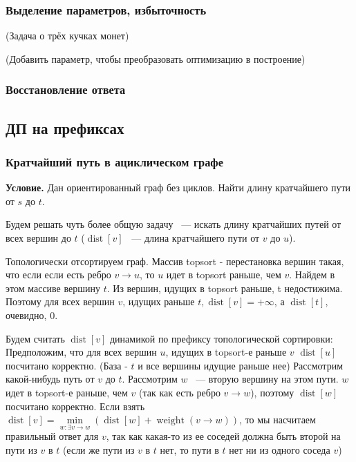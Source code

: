 \documentclass[a4paper,12pt]{article}
\begin{document}
      \subsubsection{Выделение параметров, избыточность}

      (Задача о трёх кучках монет)

      (Добавить параметр, чтобы преобразовать оптимизацию в построение)

      \subsubsection{Восстановление ответа}

    \subsection{ДП на префиксах}

      \subsubsection{Кратчайший путь в ациклическом графе}
      \textbf{Условие.} Дан ориентированный граф без циклов. Найти 
      длину кратчайшего пути от $s$ до $t$.
      
      Будем решать чуть более общую задачу ~--- искать длину кратчайших 
      путей от всех вершин до $t$ ($\operatorname{dist}[v]$ ~--- длина 
      кратчайшего пути от $v$ до $u$).
      
      Топологически отсортируем граф. Массив topsort - перестановка 
      вершин такая, что если если есть ребро $v\rightarrow u$, то $u$ 
      идет в topsort раньше, чем $v$. Найдем в этом массиве вершину $t$. 
      Из вершин, идущих в topsort раньше, t недостижима. Поэтому 
      для всех вершин $v$, идущих раньше $t, \operatorname{dist}[v] = +\infty$, а 
      $\operatorname{dist}[t]$, очевидно, $0$.
      
      Будем считать $\operatorname{dist}[v]$ динамикой по префиксу 
      топологической сортировки:
      Предположим, что для всех вершин $u$, идущих в topsort-е раньше $v$ 
      $\operatorname{dist}[u]$ посчитано корректно. (База - $t$ и все 
      вершины идущие раньше нее) Рассмотрим какой-нибудь путь от $v$ до $t$. 
      Рассмотрим $w$ ~--- вторую вершину на этом пути. $w$ идет в topsort-е 
      раньше, чем $v$ (так как есть ребро $v\rightarrow w$), поэтому 
      $\operatorname{dist}[w]$ посчитано корректно. Если взять
      $\operatorname{dist}[v] = \min\limits_{w: \exists v \rightarrow w}
      (\operatorname{dist}[w] + \operatorname{weight}(v \rightarrow w))$, 
      то мы насчитаем правильный ответ для $v$, так как какая-то из ее соседей 
      должна быть второй на пути из $v$ в $t$ (если же пути из $v$ в $t$ нет, 
      то пути в $t$ нет ни из одного соседа $v$)
      
\end{document}
